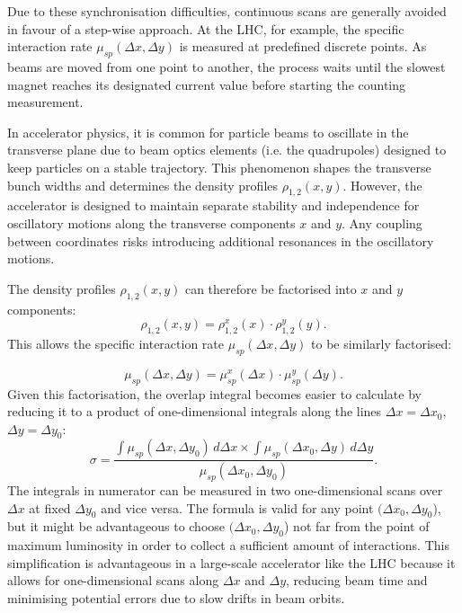 Due to these synchronisation difficulties, continuous scans are generally avoided in favour of a step-wise approach. At the LHC, for example, the specific interaction rate $\mu_{sp}(\Delta x,\Delta y)$ is measured at predefined discrete points. As beams are moved from one point to another, the process waits until the slowest magnet reaches its designated current value before starting the counting measurement.

In accelerator physics, it is common for particle beams to oscillate in the transverse plane due to beam optics elements (i.e. the quadrupoles) designed to keep particles on a stable trajectory. This phenomenon shapes the transverse bunch widths and determines the density profiles $\rho _{1,2}(x, y)$. However, the accelerator is designed to maintain separate stability and independence for oscillatory motions along the transverse components $x$ and $y$. Any coupling between coordinates risks introducing additional resonances in the oscillatory motions.

The density profiles $\rho _{1,2}(x, y)$ can therefore be factorised into $x$ and $y$ components:
\begin{equation}
\rho _{1,2}(x, y) = \rho _{1,2}^x(x) \cdot \rho _{1,2}^y(y).
\end{equation}
This allows the specific interaction rate $\mu_{sp}(\Delta x, \Delta y)$ to be similarly factorised:

\begin{equation}
\mu _{sp}(\Delta x, \Delta y) = \mu ^x_{sp}(\Delta x) \cdot \mu ^y_{sp}(\Delta y).
\end{equation}
Given this factorisation, the overlap integral becomes easier to calculate by reducing it to a product of one-dimensional integrals  along the lines $\Delta x = \Delta x_0$, $\Delta y = \Delta y_0$:
\begin{equation}
\sigma = \frac{\int \mu _{sp}(\Delta x, \Delta y_0)\, d\Delta x \times \int \mu _{sp}(\Delta x_0, \Delta y)\, d\Delta y}{\mu _{sp}(\Delta x_0, \Delta y_0)}.\label{definition_sigma_vdm}
\end{equation}
The integrals in numerator can be measured in two one-dimensional scans over $\Delta x$ at fixed $\Delta y_0$ and vice versa. The formula is valid for any point $(\Delta x_0, \Delta y_0$), but it might be advantageous to choose $(\Delta x_0, \Delta y_0$) not far from the point of maximum luminosity in order to collect a sufficient amount of interactions. This simplification is advantageous in a large-scale accelerator like the LHC because it allows for one-dimensional scans along $\Delta x$ and $\Delta y$, reducing beam time and minimising potential errors due to slow drifts in beam orbits. 

